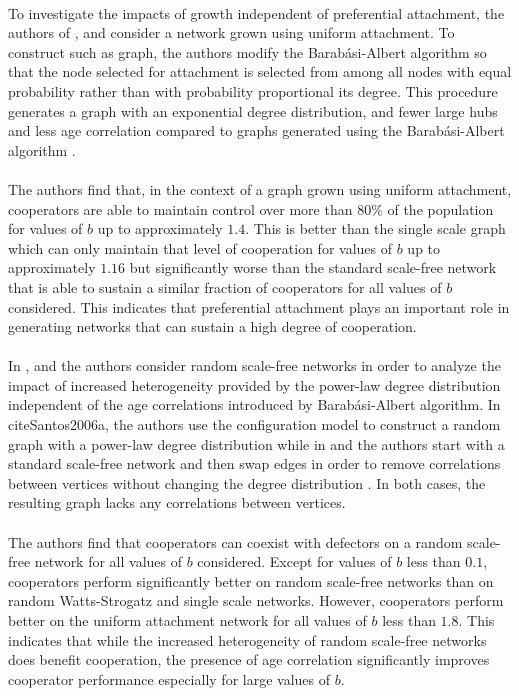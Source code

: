 \documentclass{article}
\begin{document}
	\paragraph{}To investigate the impacts of growth independent of preferential attachment, the authors of  \cite{Pacheco2005}, \cite{Santos2006a} and \cite{Santos2005b} consider a network grown using uniform attachment.  To construct such as graph, the authors modify the Barab\'{a}si-Albert algorithm so that the node selected for attachment is selected from among all nodes with equal probability rather than with probability proportional its degree.  This procedure generates a graph with an exponential degree distribution, and fewer large hubs and less age correlation compared to graphs generated using the Barab\'{a}si-Albert algorithm \cite{Santos2006a}.
	\paragraph{}The authors find that, in the context of a graph grown using uniform attachment, cooperators are able to maintain control over more than 80\% of the population for values of $b$ up to approximately $1.4$.  This is better than the single scale graph which can only maintain that level of cooperation for values of $b$ up to approximately $1.16$ but significantly worse than the standard scale-free network that is able to sustain a similar fraction of cooperators for all values of $b$ considered.  This indicates that preferential attachment plays an important role in generating networks that can sustain a high degree of cooperation.
	\paragraph{}In \cite{Santos2006a}, \cite{Santos2006b} and \cite{Santos2006c} the authors consider random scale-free networks in order to analyze the impact of increased heterogeneity provided by the power-law degree distribution independent of the age correlations introduced by Barab\'{a}si-Albert algorithm.  In cite{Santos2006a}, the authors use the configuration model \cite{Molloy1995} to construct a random graph with a power-law degree distribution while in \cite{Santos2006b} and \cite{Santos2006c} the authors start with a standard scale-free network and then swap edges in order to remove correlations between vertices without changing the degree distribution \cite{Maslov2002}.  In both cases, the resulting graph lacks any correlations between vertices.
	\paragraph{}The authors find that cooperators can coexist with defectors on a random scale-free network for all values of $b$ considered.  Except for values of $b$ less than $0.1$, cooperators perform significantly better on random scale-free networks than on random Watts-Strogatz and single scale networks.  However, cooperators perform better on the uniform attachment network for all values of $b$ less than $1.8$.  This indicates that while the increased heterogeneity of random scale-free networks does benefit cooperation, the presence of age correlation significantly improves cooperator performance especially for large values of $b$.
\end{document}
